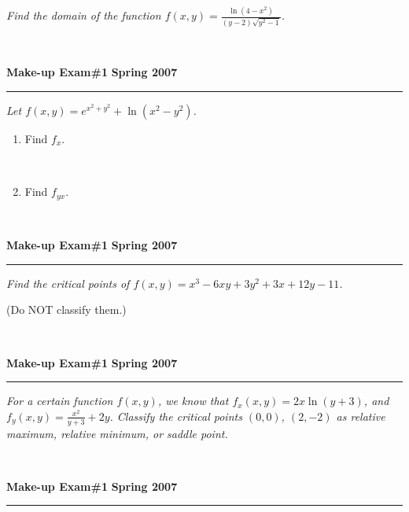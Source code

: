\documentclass[12pt]{article}
\begin{document}
\bigskip
{\problem[12 pts] \em Find the domain of the function $f(x,y) =
  \displaystyle{\frac{\ln (4-x^2)}{(y-2) \sqrt{y^2-1}}}$.}
\vspace{18cm}
  \begin{flushright}
     \framebox[10cm]{\raisebox{1cm}[2.6cm][0.4cm]} \\
  \end{flushright}
\newpage
\hfill{\large\bf Make-up Exam\#1}\hfill{\large\bf
  Spring 2007}\hrule

\bigskip
{\problem[14 pts] \em Let $f(x,y) = e^{x^2+y^2} + \ln (x^2 - y^2)$.}
\begin{enumerate}
\item Find $f_x$.
  \vspace{7cm}
  \begin{flushright}
    \framebox[10cm]{\raisebox{1cm}[2.6cm][0.4cm]} \\
  \end{flushright}
\item Find $f_{yx}$.
  \vspace{7cm}
  \begin{flushright}
    \framebox[10cm]{\raisebox{1cm}[2.6cm][0.4cm]} \\
  \end{flushright}
\end{enumerate}
\newpage
\hfill{\large\bf Make-up Exam\#1}\hfill{\large\bf
  Spring 2007}\hrule

\bigskip
{\problem[14 pts] \em Find the critical points of $f(x,y) =
  x^3-6xy+3y^2+3x+12y-11$.

  \noindent(Do NOT classify them.)}
\vspace{18cm}
  \begin{flushright}
    \framebox[10cm]{\raisebox{1cm}[2.6cm][0.4cm]} \\
  \end{flushright}
\newpage
\hfill{\large\bf Make-up Exam\#1}\hfill{\large\bf
  Spring 2007}\hrule 
\bigskip
{\problem[14 pts] \em For a certain function $f(x,y)$, we know that
  $f_{x}(x,y) = 2x\ln (y+3)$, and
  $f_{y}(x,y)=\displaystyle{\frac{x^2}{y+3}}+2y$. Classify the
  critical points $(0,0)$, $(2,-2)$ as
  relative maximum, relative minimum, or saddle point.}
\vspace{18cm}
  \begin{flushright}
    \framebox[10cm]{\raisebox{1cm}[2.6cm][0.4cm]} \\
  \end{flushright}
\newpage
\hfill{\large\bf Make-up Exam\#1}\hfill{\large\bf
  Spring 2007}\hrule
\end{document}
